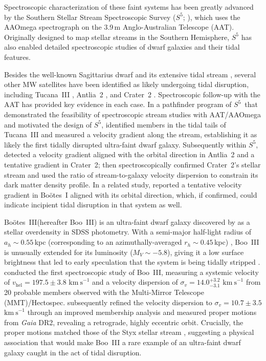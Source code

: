 \documentclass[twocolumn, apj, numberedappendix, appendixfloats]{openjournal_dhayaa}
\newcommand{\SSSSS}{${S}^5$\xspace}
\newcommand{\gaia}{\textit{Gaia}\xspace}
\newcommand{\boo}{Bo\"{o}tes~III\xspace}
\newcommand{\vlosUnits}{$\mathrm{km~s}^{-1}$\xspace}
\begin{document}
Spectroscopic characterization of these faint systems has been greatly advanced by the Southern Stellar Stream Spectroscopic Survey (\SSSSS; \citealt{Li2019, Li2022}), which uses the AAOmega spectrograph \citep{Sharp2006} on the 3.9\,m Anglo-Australian Telescope (AAT). Originally designed to map stellar streams in the Southern Hemisphere, \SSSSS has also enabled detailed spectroscopic studies of dwarf galaxies and their tidal features.

Besides the well-known Sagittarius dwarf and its extensive tidal stream \citep{Vasiliev2021}, several other MW satellites have been identified as likely undergoing tidal disruption, including Tucana~III \citep{DrlicaWagner2015, Simon2017}, Antlia~2 \citep{Torrealba2019}, and Crater~2 \citep{Torrealba2016, Caldwell2017}. Spectroscopic follow-up with the AAT has provided key evidence in each case. In a pathfinder program of \SSSSS\ that demonstrated the feasibility of spectroscopic stream studies with AAT/AAOmega and motivated the design of \SSSSS, \citet{Li2018tucIII} identified members in the tidal tails of Tucana~III and measured a velocity gradient along the stream, establishing it as likely the first tidally disrupted ultra-faint dwarf galaxy. Subsequently within \SSSSS, \citet{Ji2021} detected a velocity gradient aligned with the orbital direction in Antlia~2 and a tentative gradient in Crater~2; \citet{Limberg2025} then spectroscopically confirmed Crater~2's stellar stream and used the ratio of stream-to-galaxy velocity dispersion to constrain its dark matter density profile. In a related study, \citet{Sandford2025} reported a tentative velocity gradient in Bo\"{o}tes~I aligned with its orbital direction, which, if confirmed, could indicate incipient tidal disruption in that system as well.

\boo (hereafter Boo~III) is an ultra-faint dwarf galaxy discovered by \citet{Grillmair2009} as a stellar overdensity in SDSS photometry. With a semi-major half-light radius of $a_h \sim 0.55$\,kpc (corresponding to an azimuthally-averaged $r_h \sim 0.45$\,kpc) \citep{Moskowitz2020}, Boo~III is unusually extended for its luminosity ($M_V \sim -5.8$), giving it a low surface brightness that led to early speculation that the system is being tidally stripped \citep{Carlin2009, Correnti2009}. \citet{Carlin2009} conducted the first spectroscopic study of Boo~III, measuring a systemic velocity of $v_{\mathrm{hel}} = 197.5 \pm 3.8$ \vlosUnits and a velocity dispersion of $\sigma_v = 14.0^{+3.2}_{-3.1}$ \vlosUnits from 20 probable members observed with the Multi-Mirror Telescope (MMT)/Hectospec. \citet{Carlin2018} subsequently refined the velocity dispersion to $\sigma_v = 10.7 \pm 3.5$ \vlosUnits through an improved membership analysis and measured proper motions from \gaia DR2, revealing a retrograde, highly eccentric orbit. Crucially, the proper motions matched those of the Styx stellar stream \citep{Grillmair2009}, suggesting a physical association that would make Boo~III a rare example of an ultra-faint dwarf galaxy caught in the act of tidal disruption.
\end{document}
